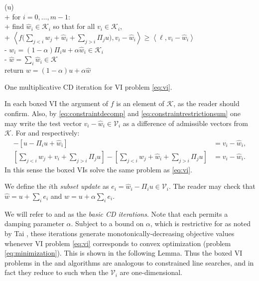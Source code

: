 \documentclass[letterpaper,final,12pt,reqno]{amsart}
\theoremstyle{cstyle}
\theoremstyle{cstyle*}
\theoremstyle{dstyle}
\numberwithin{equation}{section}
\numberwithin{figure}{section}
\numberwithin{table}{section}
\numberwithin{theorem}{section}
\newcommand{\cK}{\mathcal{K}}
\newcommand{\cV}{\mathcal{V}}
\newcommand{\ip}[2]{\left<#1,#2\right>}
\begin{document}
\begin{pseudofloat}
\begin{pseudo*}
(u)\text{:} \\+
    for $i = 0,\dots,m-1$: \\+
        \rm{find} $\hat w_i\in \cK_i$ \rm{so that for all} $v_i\in \cK_i$, \\+
            $\displaystyle \boxed{\ip{f\Big(\sum_{j<i} w_j + \hat w_i + \sum_{j>i} \Pi_j u\Big)}{v_i-\hat w_i} \ge \ip{\ell}{v_i-\hat w_i}}$ \\-
            $w_i = (1-\alpha) \Pi_i u + \alpha \hat w_i\in\cK_i$ \\-
    $\hat w = \sum_i \hat w_i\in\cK$ \\
    return $w=(1-\alpha) u + \alpha \hat w$
\end{pseudo*}
\caption{One multiplicative CD iteration for VI problem \eqref{eq:vi}.}
\label{alg:basiccd-mult}
\end{pseudofloat}

In each boxed VI the argument of $f$ is an element of $\cK$, as the reader should confirm.  Also, by \eqref{eq:constraintdecomp} and \eqref{eq:constraintrestrictionsum} one may write the test vector $v_i - \hat w_i \in \cV_i$ as a difference of admissible vectors from $\cK$.  For  and  respectively:
\begin{align}
[u - \Pi_i u + v_i] - [u - \Pi_i u + \hat w_i] &= v_i - \hat w_i, \label{eq:admissibledifferenceadd} \\
\left[\sum_{j<i} w_j + v_i + \sum_{j>i} \Pi_j u\right] - \left[\sum_{j<i} w_j + \hat w_i + \sum_{j>i} \Pi_j u\right] &= v_i - \hat w_i.  \label{eq:admissibledifferencemult}
\end{align}
In this sense the boxed VIs solve the same problem as \eqref{eq:vi}.

We define the $i$th \emph{subset update} as $e_i = \hat w_i - \Pi_i u \in \cV_i$.  The reader may check that $\hat w = u + \sum_{i} e_i$ and $w = u + \alpha \sum_i e_i$.

We will refer to  and  as the \emph{basic CD iterations}.  Note that each permits a damping parameter $\alpha$.  Subject to a bound on $\alpha$, which is restrictive for  as noted by Tai \cite{Tai2003}, these iterations generate monotonically-decreasing objective values whenever VI problem \eqref{eq:vi} corresponds to convex optimization (problem \eqref{eq:minimization}).  This is shown in the following Lemma.  Thus the boxed VI problems in the  and  algorithms are analogous to constrained line searches, and in fact they reduce to such when the $\cV_i$ are one-dimensional.
\end{document}
